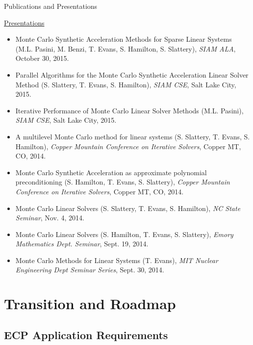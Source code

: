 \documentclass{beamer}
\begin{document}

\begin{frame}{Publications and Presentations}

  \underline{Presentations}
  \begin{itemize}
    \footnotesize
    \setlength{\itemsep}{-0.1\baselineskip}
  \item Monte Carlo Synthetic Acceleration Methods for Sparse Linear Systems
    (M.L. Pasini, M. Benzi, T. Evans, S. Hamilton, S. Slattery), \textit{SIAM
      ALA}, October 30, 2015.
  \item Parallel Algorithms for the Monte Carlo Synthetic Acceleration Linear
    Solver Method (S. Slattery, T. Evans, S. Hamilton), \textit{SIAM CSE},
    Salt Lake City, 2015.
  \item Iterative Performance of Monte Carlo Linear Solver Methods
    (M.L. Pasini), \textit{SIAM CSE}, Salt Lake City, 2015.
  \item A multilevel Monte Carlo method for linear systems (S. Slattery,
    T. Evans, S. Hamilton), \textit{Copper Mountain Conference on Iterative
      Solvers}, Copper MT, CO, 2014.
  \item Monte Carlo Synthetic Acceleration as approximate polynomial
    preconditioning (S. Hamilton, T. Evans, S. Slattery), \textit{Copper
      Mountain Conference on Iterative Solvers}, Copper MT, CO, 2014.
  \item Monte Carlo Linear Solvers (S. Slattery, T. Evans, S. Hamilton),
    \textit{NC State Seminar}, Nov. 4, 2014.
  \item Monte Carlo Linear Solvers (S. Hamilton, T. Evans, S. Slattery),
    \textit{Emory Mathematics Dept. Seminar}, Sept. 19, 2014.
  \item Monte Carlo Methods for Linear Systems (T. Evans), \textit{MIT Nuclear
      Engineering Dept Seminar Series}, Sept. 30, 2014.
  \end{itemize}

\end{frame}

\section{Transition and Roadmap}
\subsection{ECP Application Requirements}
\end{document}
